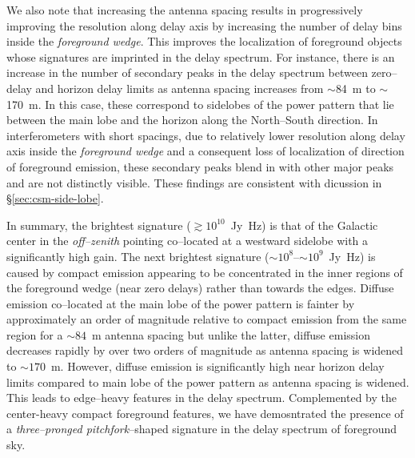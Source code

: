 \documentclass[preprint2,iop,numberedappendix]{emulateapj}
\begin{document}
We also note that increasing the antenna spacing results in progressively improving the resolution along delay axis by increasing the number of delay bins inside the {\it foreground wedge}. This improves the localization of foreground objects whose signatures are imprinted in the delay spectrum. For instance, there is an increase in the number of secondary peaks in the delay spectrum between zero--delay and horizon delay limits as antenna spacing increases from $\sim$84~m to $\sim$170~m. In this case, these correspond to sidelobes of the power pattern that lie between the main lobe and the horizon along the North--South direction. In interferometers with short spacings, due to relatively lower resolution along delay axis inside the {\it foreground wedge} and a consequent loss of localization of direction of foreground emission, these secondary peaks blend in with other major peaks and are not distinctly visible. These findings are consistent with dicussion in \S\ref{sec:csm-side-lobe}.

In summary, the brightest signature ($\gtrsim 10^{10}$~Jy~Hz) is that of the Galactic center in the {\it off--zenith} pointing co--located at a westward sidelobe with a significantly high gain. The next brightest signature ($\sim 10^8$--$\sim 10^9$~Jy~Hz) is caused by compact emission appearing to be concentrated in the inner regions of the foreground wedge (near zero delays) rather than towards the edges. Diffuse emission co--located at the main lobe of the power pattern is fainter by approximately an order of magnitude relative to compact emission from the same region for a $\sim 84$~m antenna spacing but unlike the latter, diffuse emission decreases rapidly by over two orders of magnitude as antenna spacing is widened to $\sim 170$~m. However, diffuse emission is significantly high near horizon delay limits compared to main lobe of the power pattern as antenna spacing is widened. This leads to edge--heavy features in the delay spectrum. Complemented by the center-heavy compact foreground features, we have demosntrated the presence of a {\it three--pronged pitchfork}--shaped signature in the delay spectrum of foreground sky.

\end{document}
